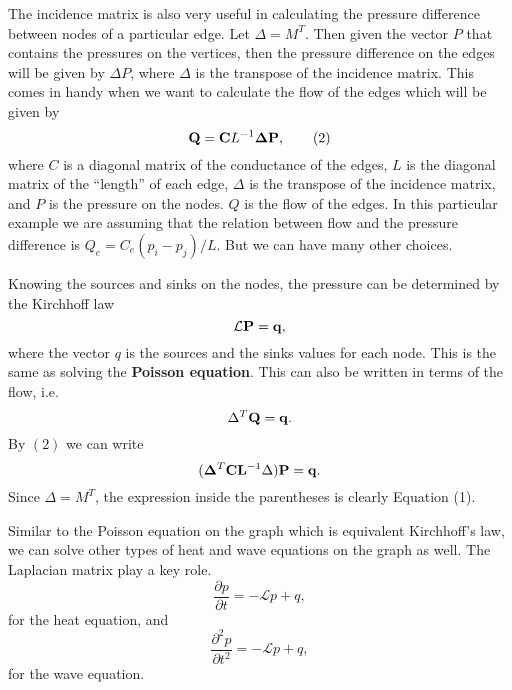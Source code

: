\documentclass[10pt,a4paper,twocolumn]{article}
\begin{document}
	
	The incidence matrix is also very useful in calculating the pressure difference between nodes of a particular edge. Let $ \Delta = M^T $. Then given the vector $ P $ that contains the pressures on the vertices, then the pressure difference on the edges will be given by $ \Delta P $, where $ \Delta  $ is the transpose of the incidence matrix. This comes in handy when we want to calculate the flow of the edges which will be given by
	 \[ \bf{Q} = \bf{C} L^{-1} \bf{\Delta} \bf{P}, \tag{2} \]
	where $ C $ is a diagonal matrix of the conductance of the edges, $ L $ is the diagonal matrix of the ``length'' of each edge, $ \Delta $ is the transpose of the incidence matrix, and $ P $ is the pressure on the nodes. $ Q $ is the flow of the edges. In this particular example we are assuming that the relation between flow and the pressure difference is $ Q_e = C_e (p_i - p_j)/L $. But we can have many other choices.
	
	Knowing the sources and sinks on the nodes, the pressure can be determined by the Kirchhoff law
	\[ \mathcal{L} \bf{P} = \bf{q}, \]
	where the vector $ q $ is the sources and the sinks values for each node. This is the same as solving the \textbf{Poisson equation}. This can also be written in terms of the flow, i.e.
	\[ \Delta^T \bf{Q} = \bf{q}. \] 
	By $ (2) $ we can write
	\[ (\bf{\Delta}^T \bf{C}\bf{L}^{-1}\Delta) \bf{P} = \bf{q}. \]
	Since $ \Delta = M^T $, the expression inside the parentheses is clearly Equation (1).
	
	Similar to the Poisson equation on the graph which is equivalent Kirchhoff's law, we can solve other types of heat and wave equations on the graph as well. The Laplacian matrix play a key role.
	\[ \frac{\partial p}{\partial t} = - \mathcal{L} p + q,  \] 
	for the heat equation, and
	\[ \frac{\partial^2 p}{\partial t^2} = -\mathcal{L}p + q, \]
	for the wave equation.
	
\end{document}
